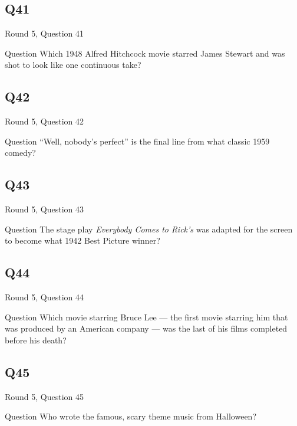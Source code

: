 \documentclass[11pt]{beamer}
\begin{document}
\subsection*{Q41}
\begin{frame}[t]{Round 5, Question 41}
\vspace{2em}
\begin{block}{Question}
Which 1948 Alfred Hitchcock movie starred James Stewart and was shot to look like one continuous take?
\end{block}
\end{frame}
    

\subsection*{Q42}
\begin{frame}[t]{Round 5, Question 42}
\vspace{2em}
\begin{block}{Question}
``Well, nobody's perfect'' is the final line from what classic 1959 comedy?
\end{block}
\end{frame}
    

\subsection*{Q43}
\begin{frame}[t]{Round 5, Question 43}
\vspace{2em}
\begin{block}{Question}
The stage play \emph{Everybody Comes to Rick's} was adapted for the screen to become what 1942 Best Picture winner?
\end{block}
\end{frame}
    

\subsection*{Q44}
\begin{frame}[t]{Round 5, Question 44}
\vspace{2em}
\begin{block}{Question}
Which movie starring Bruce Lee — the first movie starring him that was produced by an American company — was the last of his films completed before his death?
\end{block}
\end{frame}
    

\subsection*{Q45}
\begin{frame}[t]{Round 5, Question 45}
\vspace{2em}
\begin{block}{Question}
Who wrote the famous, scary theme music from Halloween?
\end{block}
\end{frame}
    
\end{document}
